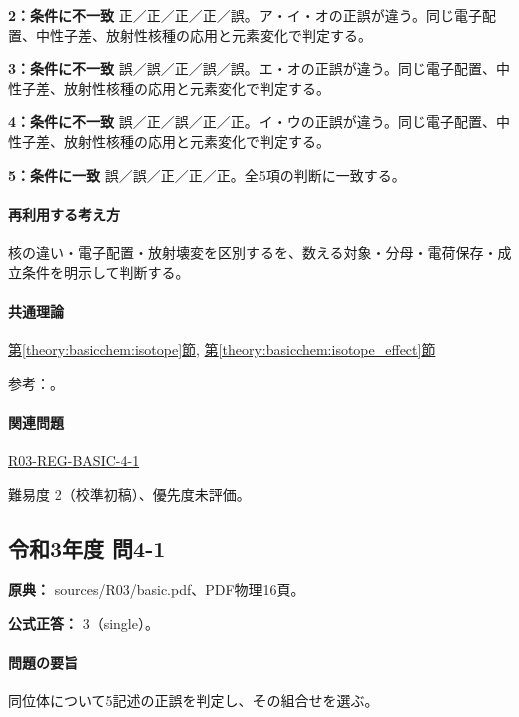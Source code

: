 \noindent\textbf{2：条件に不一致} 正／正／正／正／誤。ア・イ・オの正誤が違う。同じ電子配置、中性子差、放射性核種の応用と元素変化で判定する。\par

\noindent\textbf{3：条件に不一致} 誤／誤／正／誤／誤。エ・オの正誤が違う。同じ電子配置、中性子差、放射性核種の応用と元素変化で判定する。\par

\noindent\textbf{4：条件に不一致} 誤／正／誤／正／正。イ・ウの正誤が違う。同じ電子配置、中性子差、放射性核種の応用と元素変化で判定する。\par

\noindent\textbf{5：条件に一致} 誤／誤／正／正／正。全5項の判断に一致する。\par

\paragraph{再利用する考え方} 核の違い・電子配置・放射壊変を区別するを、数える対象・分母・電荷保存・成立条件を明示して判断する。

\paragraph{共通理論} \hyperref[theory:basicchem:isotope]{第\ref*{theory:basicchem:isotope}節}, \hyperref[theory:basicchem:isotope_effect]{第\ref*{theory:basicchem:isotope_effect}節}

\par 参考：\cite{iupac_isotopes,iupac_isotope_effect}。

\paragraph{関連問題} \hyperref[q:r03-reg-basic-4-1]{R03-REG-BASIC-4-1}

\par 難易度 2（校準初稿）、優先度未評価。

\subsection{令和3年度 問4-1}
\label{q:r03-reg-basic-4-1}

\noindent\textbf{原典：} sources/R03/basic.pdf、PDF物理16頁。

\textbf{公式正答：} 3（single）。

\paragraph{問題の要旨} 同位体について5記述の正誤を判定し、その組合せを選ぶ。

